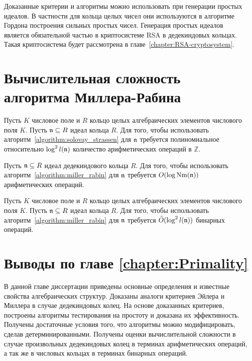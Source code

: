 \documentclass[_00_autoref.tex]{subfiles}
\begin{document}
\begin{remark}
    Доказанные критерии и алгоритмы можно использовать при генерации простых идеалов.
    В частности для кольца целых чисел они используются в алгоритме Гордона построения сильных простых чисел.
    Генерация простых идеалов является обязательной частью в криптосистеме RSA в дедекиндовых кольцах.
    Такая криптосистема будет рассмотрена в главе~\ref{chapter:RSA-cryptosystem}.
\end{remark}

\section{Вычислительная сложность алгоритма Миллера-Рабина}

\begin{proposition}
    Пусть $K$ числовое поле и $R$ кольцо целых алгебраических элементов числового поля $K$.
    Пусть $\mathfrak{n} \subseteq R$ идеал кольца $R$.
    Для того, чтобы использовать алгоритм~\ref{algorithm:solovay_strassen} для $\mathfrak{n}$ требуется полиномиальное относительно $\log^2 l(\mathfrak{n})$ количество арифметических операций в $\mathbb{Z}$.
\end{proposition}

\begin{proposition}
    Пусть $\mathfrak{n} \subseteq R$ идеал дедекиндового кольца $R$.
    Для того, чтобы использовать алгоритм~\ref{algorithm:miller_rabin} для $\mathfrak{n}$ требуется $O(\log \textrm{Nm}(\mathfrak{n}))$ арифметических операций.
\end{proposition}

\begin{proposition}
    Пусть $K$ числовое поле и $R$ кольцо целых алгебраических элементов числового поля $K$.
    Пусть $\mathfrak{n} \subseteq R$ идеал кольца $R$.
    Для того, чтобы использовать алгоритм~\ref{algorithm:miller_rabin} для $\mathfrak{n}$ требуется $\tilde{O}(\log^2 l(\mathfrak{n}))$ бинарных операций.
\end{proposition}

\section*{Выводы по главе \ref{chapter:Primality}}

В данной главе диссертации приведены основные определения и известные свойства алгебраических структур.
Доказаны аналоги критериев Эйлера и Миллера в случае дедекиндовых колец.
На основе доказанных критериев, построены алгоритмы тестирования на простоту и доказана их эффективность.
Получены достаточные условия того, что алгоритмы можно модифицировать, сделав детерминированными.
Получены оценки вычислительной сложности в случае произвольных дедекиндовых колец в терминах арифметических операций, а так же в числовых кольцах в терминах бинарных операций.
\end{document}

